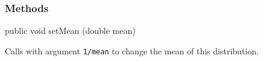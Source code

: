 \subsubsection* {Methods}
\begin{code}

   public void setMean (double mean)\begin{hide} {
      setLambda (1.0 / mean);
   }
}\end{hide}
\end{code}
\begin{tabb}   Calls 
 with argument \texttt{1/mean} to change the mean of this distribution.
\end{tabb}
\begin{htmlonly}
\end{htmlonly}
